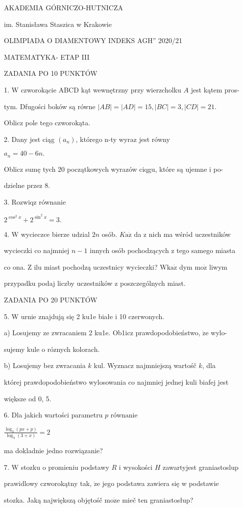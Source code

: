 \documentclass[a4paper,12pt]{article}
\begin{document}
AKADEMIA GÓRNICZO-HUTNICZA

im. Stanisława Staszica w Krakowie

OLIMPIADA O DIAMENTOWY INDEKS AGH'' 2020/21

MATEMATYKA- ETAP III

ZADANIA PO 10 PUNKTÓW

1. $\mathrm{W}$ czworokącie ABCD kąt wewnętrzny przy wierzcholku $A$ jest kątem pros-

tym. Dfugości boków są równe $|AB| = |AD| = 15, |BC| =3, |CD| =21.$

Oblicz pole tego czworokąta.

2. Dany jest ciąg $(a_{n})$, którego n-ty wyraz jest równy

$a_{n}=40-6n.$

Oblicz sumę tych 20 początkowych wyrazów ciqgu, które są ujemne i po-

dzielne przez 8.

3. Rozwiqz równanie

$2^{\cos^{2}x}+2^{\sin^{2}x}=3.$

4. $\mathrm{W}$ wycieczce bierze udzial $2n$ osób. $K\mathrm{a}\dot{\mathrm{z}}$ da z nich ma wśród uczestników

wycieczki co najmniej $n-1$ innych osób pochodzących z tego samego miasta

co ona. $\mathrm{Z}$ ilu miast pochodzą uczestnicy wycieczki? $\mathrm{W}\mathrm{k}\mathrm{a}\dot{\mathrm{z}}$ dym $\mathrm{m}\mathrm{o}\dot{\mathrm{z}}$ liwym

przypadku podaj liczby uczestników z poszczególnych miast.

ZADANIA PO 20 PUNKTÓW

5. $\mathrm{W}$ urnie znajdują się 2 ku1e białe i 10 czerwonych.

a) Losujemy ze zwracaniem 2 ku1e. Ob1icz prawdopodobieństwo, $\dot{\mathrm{z}}\mathrm{e}$ wylo-

sujemy kule o róznych kolorach.

b) Losujemy bez zwracania $k$ kul. Wyznacz najmniejszą wartośč $k$, dla

której prawdopodobieństwo wylosowania co najmniej jednej kuli biafej jest

większe od 0, 5.

6. Dla jakich wartości parametru $p$ równanie

$\displaystyle \frac{\log_{3}(px+p)}{\log_{3}(3+x)}=2$

ma dokladnie jedno rozwiązanie?

7. $\mathrm{W}$ stozku o promieniu podstawy $R$ i wysokości $H$ zawartyjest graniastoslup

prawidlowy czworokątny tak, $\dot{\mathrm{z}}\mathrm{e}$ jego podstawa zawiera się w podstawie

stozka. Jaką największą objętośč $\mathrm{m}\mathrm{o}\dot{\mathrm{z}}\mathrm{e}$ mieč ten graniastosłup?
\end{document}
